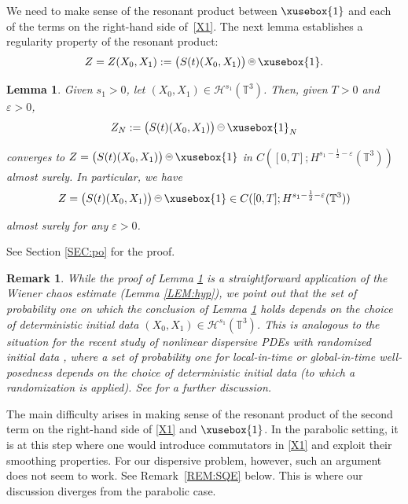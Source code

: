 \documentclass[%
11pt,  reqno]{amsart}
\def\<#1>{\xusebox{#1}}
\newcommand{\pe}{\mathbin{\scaleobj{0.7}{\tikz \draw (0,0) node[shape=circle,draw,inner sep=0pt,minimum size=8.5pt] {\scriptsize  $=$};}}}
\newtheorem{lemma}[theorem]{Lemma}
\newtheorem{remark}[theorem]{Remark}
\newcommand{\1}{\hspace{0.2mm}\text{I}\hspace{0.2mm}}
\newcommand{\noi}{\noindent}
\newcommand{\T}{\mathbb{T}}
\newcommand{\eps}{\varepsilon}
\renewcommand{\H}{\mathcal{H}}
\numberwithin{equation}{section}
\numberwithin{theorem}{section}
\begin{document}
We need to make sense of  the  resonant product between $\<1>$
and each of the terms on the right-hand side of~\eqref{X1}.
The next lemma establishes a regularity property of 
  the resonant product: 
\begin{align*}
Z =Z(X_0, X_1):= \big(S(t) (X_0,   X_1)\big) \pe \<1>.
\end{align*}



\begin{lemma}\label{LEM:IV}
Given   $s_1 > 0$, %
let  $(X_0, X_1) \in \H^{s_1}(\T^3)$.
Then, 
given  $T >0$  and $\eps > 0$,
\begin{align*}
Z_N := \big(S(t) (X_0,   X_1)\big) \pe \<1>_N
\end{align*}

\noi
 converges to $Z = \big(S(t) (X_0,   X_1)\big) \pe \<1>$
 in $C([0,T];H^{ s_1 - \frac 12 -\eps}(\T^3))$ almost surely.
 In particular, we have
\begin{align*}
Z = \big(S(t) (X_0,   X_1)\big) \pe \<1> \in C([0,T];H^{ s_1 - \frac 12 -\eps}(\T^3))
\end{align*}

\noi
  almost surely  for any  $\eps > 0$.


\end{lemma}


See Section \ref{SEC:po} for the proof.

\begin{remark}\label{REM:IV}\rm
While the proof of Lemma \ref{LEM:IV}
is a straightforward application of the Wiener chaos estimate (Lemma \ref{LEM:hyp}), 
we point out that the set of probability one on which 
the conclusion of Lemma \ref{LEM:IV} holds depends
on the choice of deterministic initial data $(X_0, X_1) \in \H^{s_1}(\T^3)$.
This is analogous to the situation
for the recent study of
nonlinear dispersive PDEs
with randomized initial data \cite{BT1, BT3, LM, BOP2, POC, OP, OP2, BOP3},
where a set of probability one for local-in-time or global-in-time well-posedness
depends on the choice of deterministic initial data (to which a randomization is applied).
See \cite{BT3} for a further discussion.

\end{remark}




The main difficulty arises in making sense of 
the resonant product of the second term on the right-hand side of \eqref{X1}
and $\<1>$.
In the parabolic setting, 
it is at this step where
one would introduce commutators in \eqref{X1} and exploit their smoothing properties.
For our dispersive problem, however, such an argument does not seem to work.
See Remark~\ref{REM:SQE} below.
This is where our discussion  diverges from the parabolic case. 
\end{document}
